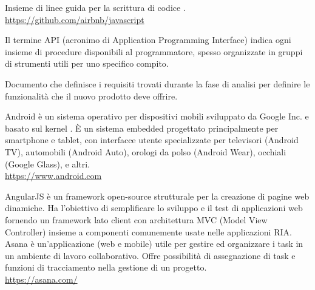 Insieme di linee guida per la scrittura di codice .\\
\url{https://github.com/airbnb/javascript}

Il termine API (acronimo di Application Programming Interface) indica ogni insieme di procedure disponibili al programmatore, spesso organizzate in gruppi di strumenti utili per uno specifico compito.

Documento che definisce i requisiti trovati durante la fase di analisi per definire le funzionalità che il nuovo prodotto deve offrire.

Android è un sistema operativo per dispositivi mobili sviluppato da Google Inc. e basato sul kernel . \`{E} un sistema embedded progettato principalmente per smartphone e tablet, con interfacce utente specializzate per televisori (Android TV), automobili (Android Auto), orologi da polso (Android Wear), occhiali (Google Glass), e altri.\\
\url{https://www.android.com}

AngularJS è un framework open-source strutturale per la creazione di pagine web dinamiche. Ha l'obiettivo di semplificare lo sviluppo e il test di applicazioni web fornendo un framework lato client con architettura MVC (Model View Controller) insieme a componenti comunemente usate nelle applicazioni RIA.\\

Asana è un’applicazione (web e mobile) utile per gestire ed organizzare i task in un ambiente di lavoro collaborativo. Offre possibilità di assegnazione di task e funzioni di tracciamento nella gestione di un progetto.\\
\url{https://asana.com/}
\clearpage
